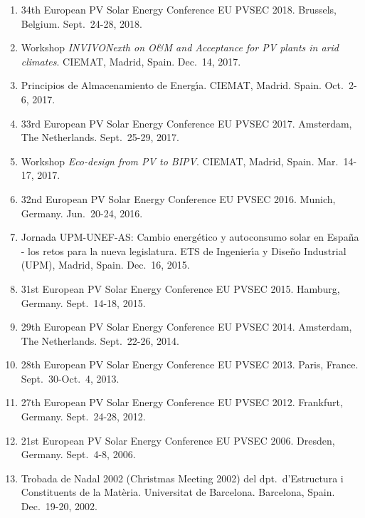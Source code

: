 \documentclass{article}
\begin{document}
\begin{enumerate}
\item
34th European PV Solar Energy Conference EU PVSEC 2018.
Brussels, Belgium.
Sept.~24-28, 2018.

\item
Workshop {\it INVIVONexth on O\&M and Acceptance for PV plants in arid climates}.
CIEMAT, Madrid, Spain.
Dec.~14, 2017. 

\item
Principios de Almacenamiento de Energ{\'\i}a.
CIEMAT, Madrid. Spain.
Oct.~2-6, 2017. 

\item
33rd European PV Solar Energy Conference EU PVSEC 2017.
Amsterdam, The Netherlands.
Sept.~25-29, 2017.

\item
Workshop {\it Eco-design from PV to BIPV}.
CIEMAT, Madrid, Spain.
Mar.~14-17, 2017. 

\item
32nd European PV Solar Energy Conference EU PVSEC 2016.
Munich, Germany.
Jun.~20-24, 2016.

\item
Jornada UPM-UNEF-AS:  Cambio energ\'etico y autoconsumo solar en Espa\~na - los retos para la nueva legislatura.
ETS de Ingenier{\'\i}a y Dise\~no Industrial (UPM), Madrid, Spain.
Dec.~16, 2015. 

\item
31st European PV Solar Energy Conference EU PVSEC 2015.
Hamburg, Germany.
Sept.~14-18, 2015.

\item
29th European PV Solar Energy Conference EU PVSEC 2014.
Amsterdam, The Netherlands.
Sept.~22-26, 2014.

\item
28th European PV Solar Energy Conference EU PVSEC 2013.
Paris, France.
Sept.~30-Oct.~4, 2013.

\item
27th European PV Solar Energy Conference EU PVSEC 2012.
Frankfurt, Germany.
Sept.~24-28, 2012.

\item
21st European PV Solar Energy Conference EU PVSEC 2006.
Dresden, Germany.
Sept.~4-8, 2006.

\item
Trobada de Nadal 2002 (Christmas Meeting 2002) del dpt.~d'Estructura 
i Constituents de la Mat\`eria. 
Universitat de Barcelona.
Barcelona, Spain.
Dec.~19-20, 2002.


\end{enumerate}
\end{document}
